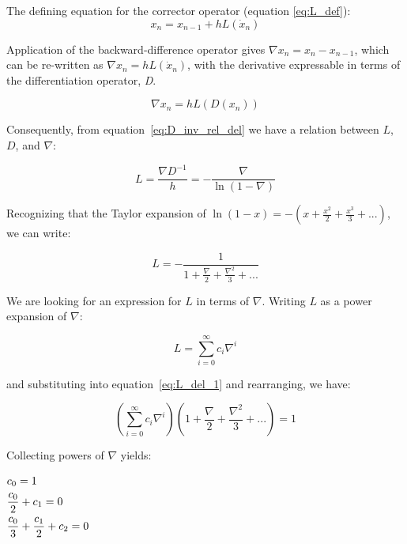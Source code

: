 The defining equation for the corrector operator (equation \ref{eq:L_def}):
\begin{equation*}
x_{n}=x_{n-1}+hL({\dot{x}}_{n})
\end{equation*}

Application of the backward-difference operator gives 
$\nabla x_{n} = x_{n}-x_{n-1}$, which can be re-written as 
$\nabla x_{n} = hL({\dot{x}}_{n})$, with the derivative expressable in terms 
of the 
 differentiation operator, \textit{D}.

\begin{equation*}
\nabla x_{n} = hL(D(x_{n}))
\end{equation*}

Consequently, from equation~\ref{eq:D_inv_rel_del} we have a relation between 
$L$, $D$, and $\nabla $:

\begin{equation} \label{eq:L_del_relation}
L = \frac{\nabla D^{-1}}{h} = -\frac{\nabla }{\ln (1-\nabla )}
\end{equation}

Recognizing that the Taylor expansion of 
$\ln (1-x) = -\left(x+\frac{x^{2}}{2}+\frac{x^{3}}{3}+...\right)$, we can
write:

\begin{equation}\label{eq:L_del_1}
L=-{\frac{1}{1+\frac{\nabla }{2}+\frac{\nabla ^{2}}{3}+...}}
\end{equation}


We are looking for an expression for $L$ in terms of $\nabla $.  
Writing $L$ as a power expansion of $\nabla$:

\begin{equation}\label{eq:L_c_coeffs}
L = \sum _{i=0}^{\infty}c_{i}\nabla ^{i}
\end{equation}
 

and substituting into equation~\ref{eq:L_del_1} and rearranging, we have:

\begin{equation*}
\left(\sum _{i=0}^{\infty}c_{i}\nabla ^{i}\right)
\left(1+\frac{\nabla }{2}+\frac{\nabla ^{2}}{3}+...\right) = 1
\end{equation*}

Collecting powers of $\nabla $ yields:

 $\begin{gathered}c_{0}=1\hfill \\\frac{c_{0}}{2}+c_{1}=0\hfill
\\\frac{c_{0}}{3}+\frac{c_{1}}{2}+c_{2}=0\end{gathered}$

